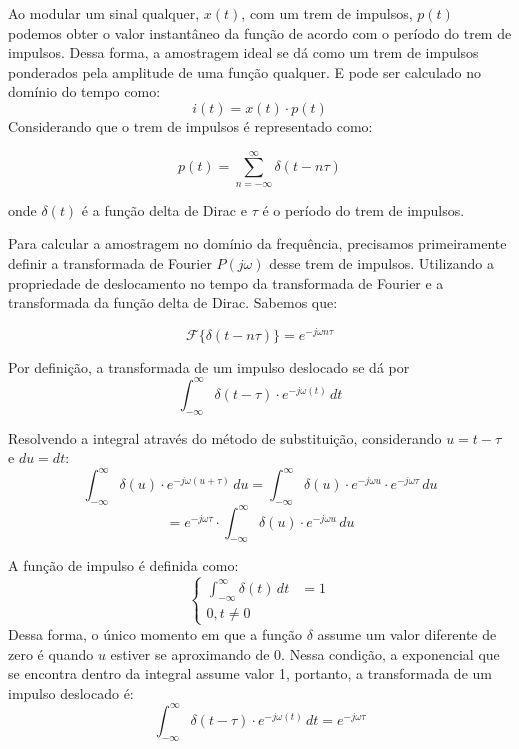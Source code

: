 Ao modular um sinal qualquer, $x(t)$, com um trem de impulsos, $p(t)$ podemos obter o valor instantâneo da função de acordo com o período do trem de impulsos. Dessa forma, a amostragem ideal se dá como um trem de impulsos ponderados pela amplitude de uma função qualquer. E pode ser calculado no domínio do tempo como:
\begin{equation}
    i(t) = x(t) \cdot p(t)
\end{equation}
Considerando que o trem de impulsos é representado como:

\begin{equation}
p(t) = \sum_{n=-\infty}^{\infty} \delta(t - n\tau)
    \label{tremimpulsos}
    \end{equation}


onde $\delta(t)$ é a função delta de Dirac e $\tau$ é o período do trem de impulsos.

Para calcular a amostragem no domínio da frequência, precisamos primeiramente definir a transformada de Fourier $P(j\omega)$ desse trem de impulsos. Utilizando a propriedade de deslocamento no tempo da transformada de Fourier e a transformada da função delta de Dirac. Sabemos que:

$$
\mathcal{F}\{\delta(t - n\tau)\} = e^{-j\omega n\tau}
$$

Por definição, a transformada de um impulso deslocado se dá por
$$
\int_{-\infty}^{\infty} \delta(t - \tau) \cdot e^{-j\omega (t)} \, dt
$$

Resolvendo a integral através do método de substituição, considerando $u = t - \tau$ e $du = dt$:
$$
\int_{-\infty}^{\infty} \delta(u) \cdot e^{-j\omega (u + \tau)} \, du
= \int_{-\infty}^{\infty} \delta(u) \cdot e^{-j\omega u} \cdot e^{-j\omega \tau} \, du
$$
$$
= e^{-j\omega \tau} \cdot \int_{-\infty}^{\infty} \delta(u) \cdot e^{-j\omega u} \, du
$$

A função de impulso é definida como:
\begin{equation}
    \begin{cases}
    \int_{-\infty}^{\infty} \delta(t) \, dt &= 1 \\
    0, t \neq 0
    \end{cases}
\end{equation}
Dessa forma, o único momento em que a função $\delta$ assume um valor diferente de zero é quando $u$ estiver se aproximando de 0. Nessa condição, a exponencial que se encontra dentro da integral assume valor 1, portanto, a transformada de um impulso deslocado é:
\begin{equation}
\int_{-\infty}^{\infty} \delta(t - \tau) \cdot e^{-j\omega (t)} \, dt = e^{-j\omega \tau}
\end{equation}


